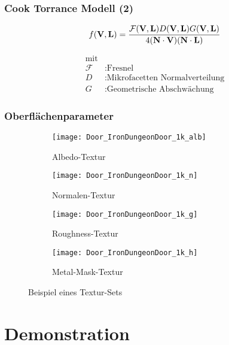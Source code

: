 \begin{frame}
  \frametitle{Cook Torrance Modell (2)}
  \begin{Definition}

    \begin{align*}
    	f(\mathbf V,\mathbf L) = \frac{\mathcal{F}(\mathbf V,\mathbf L)D(\mathbf V,\mathbf L)G(\mathbf V,\mathbf L)}{4(\mathbf N \cdot \mathbf V)(\mathbf N \cdot \mathbf L)}
    \end{align*}

    \begin{align*}
      \text{mit}\\
      \mathcal{F} &: \text{Fresnel} \\
    	D  &: \text{Mikrofacetten Normalverteilung} \\
    	G  &: \text{Geometrische Abschwächung}
    \end{align*}

  \end{Definition}
\end{frame}

\begin{frame}
  \frametitle{Oberflächenparameter}

  \begin{figure}
    \centering
    \begin{subfigure}{0.24\textwidth}
    	\texttt{[image: Door\_IronDungeonDoor\_1k\_alb]}
    	\caption{Albedo-Textur}
    \end{subfigure}
    \begin{subfigure}{0.24\textwidth}
    	\texttt{[image: Door\_IronDungeonDoor\_1k\_n]}
    	\caption{Normalen-Textur}
    \end{subfigure}
    \begin{subfigure}{0.24\textwidth}
    	\texttt{[image: Door\_IronDungeonDoor\_1k\_g]}
    	\caption{Roughness-Textur}
    \end{subfigure}
    \begin{subfigure}{0.24\textwidth}
    	\texttt{[image: Door\_IronDungeonDoor\_1k\_h]}
    	\caption{Metal-Mask-Textur}
    \end{subfigure}
    \caption{Beispiel eines Textur-Sets}
  \end{figure}

\end{frame}


\section{Demonstration}
\frame{\sectionpage}

